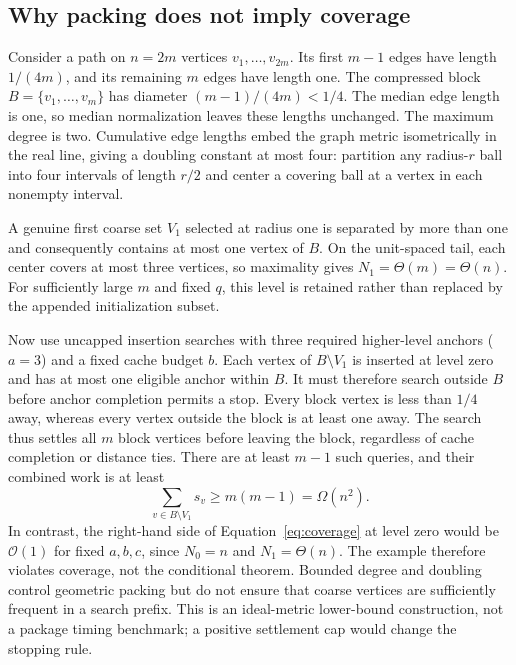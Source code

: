 \documentclass[11pt,a4paper]{article}
\newcommand{\bigO}{\mathcal O}
\begin{document}
\subsection{Why packing does not imply coverage}\label{sec:coverage-counterexample}

Consider a path on $n=2m$ vertices $v_1,\ldots,v_{2m}$. Its first $m-1$
edges have length $1/(4m)$, and its remaining $m$ edges have length one. The
compressed block $B=\{v_1,\ldots,v_m\}$ has diameter
$(m-1)/(4m)<1/4$. The median edge length is one, so median normalization
leaves these lengths unchanged. The maximum degree is two. Cumulative edge
lengths embed the graph metric isometrically in the real line, giving a
doubling constant at most four: partition any radius-$r$ ball into four
intervals of length $r/2$ and center a covering ball at a vertex in each
nonempty interval.

A genuine first coarse set $V_1$ selected at radius one is separated by more
than one and consequently contains at most one vertex of $B$. On the
unit-spaced tail, each center covers at most three vertices, so maximality
gives $N_1=\Theta(m)=\Theta(n)$. For sufficiently large $m$ and fixed $q$,
this level is retained rather than replaced by the appended initialization
subset.

Now use uncapped insertion searches with three required higher-level anchors
($a=3$) and a fixed cache budget $b$. Each vertex of $B\setminus V_1$ is
inserted at level zero and has at most one eligible anchor within $B$.
It must therefore search outside $B$ before anchor completion permits a stop.
Every block vertex is less than $1/4$ away, whereas every vertex outside the
block is at least one away. The search thus settles all $m$ block vertices
before leaving the block, regardless of cache completion or distance ties.
There are at least $m-1$ such queries, and their combined work is at least
\begin{equation}
 \sum_{v\in B\setminus V_1}s_v\geq m(m-1)=\Omega(n^2).
 \label{eq:coverage-counterexample}
\end{equation}
In contrast, the right-hand side of Equation~\eqref{eq:coverage} at level zero
would be $\bigO(1)$ for fixed $a,b,c$, since $N_0=n$ and $N_1=\Theta(n)$.
The example therefore violates coverage, not the conditional theorem. Bounded
degree and doubling control geometric packing but do not ensure that coarse
vertices are sufficiently frequent in a search prefix. This is an
ideal-metric lower-bound construction, not a package timing benchmark; a
positive settlement cap would change the stopping rule.
\end{document}
